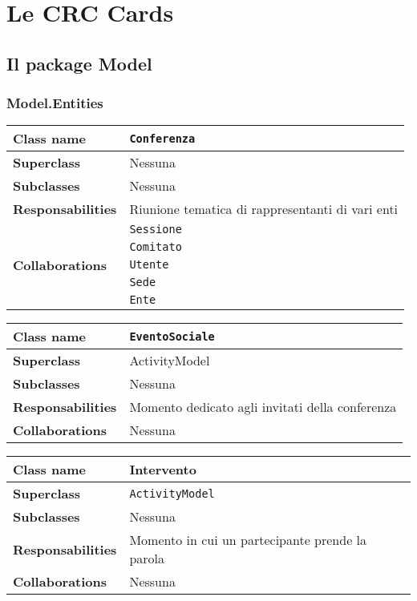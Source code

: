 \newpage
\section{Le CRC Cards}
\subsection{Il package Model}
\subsubsection{Model.Entities}
\begin{table}[h!]
	\begin{tabular}{|l|l|}
		\hline
		\textbf{Class name} & \texttt{Conferenza} \\ \hline
		\textbf{Superclass} & Nessuna \\ \hline
		\textbf{Subclasses} & Nessuna\\ \hline
		\textbf{Responsabilities} & Riunione tematica di rappresentanti di vari enti \\ \hline
		\multirow{5}{*}{\textbf{Collaborations}} & \texttt{Sessione} \\ 
		& \texttt{Comitato }\\
		& \texttt{Utente} \\
		&\texttt{Sede} \\
		& \texttt{Ente} \\ \hline
	\end{tabular}
\end{table}
\begin{table}[h!]	
		\begin{tabular}{|l|l|}
	\hline
	\textbf{Class name} & \texttt{EventoSociale} \\ \hline
	\textbf{Superclass} & ActivityModel \\ \hline
	\textbf{Subclasses} & Nessuna\\ \hline
	\textbf{Responsabilities} & Momento dedicato agli invitati della conferenza \\ \hline
	\textbf{Collaborations} & Nessuna \\ \hline
\end{tabular}
\end{table} 
\begin{table}[h!]
\begin{tabular}{|l|l|}
		\hline
		\textbf{Class name} & Intervento \\ \hline
		\textbf{Superclass} & \texttt{ActivityModel} \\ \hline
		\textbf{Subclasses} & Nessuna\\ \hline
		\textbf{Responsabilities} & Momento in cui un partecipante prende la parola \\ \hline
		\textbf{Collaborations} & Nessuna \\ \hline
	\end{tabular}
\end{table}
